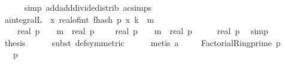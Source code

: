 \begin{isabellebody}
\ \ \ \ \isamarkupfalse%
\ {\isacharparenleft}{\kern0pt}simp\ add{\isacharcolon}{\kern0pt}add{\isacharunderscore}{\kern0pt}divide{\isacharunderscore}{\kern0pt}distrib\ ac{\isacharunderscore}{\kern0pt}simps{\isacharparenright}{\kern0pt}\isanewline
\ \ \isamarkupfalse%
\ \isamarkupfalse%
\ a{\isacharcolon}{\kern0pt}{\isachardoublequoteopen}integral\isactrlsup L\ {\isasymOmega}\ {\isacharparenleft}{\kern0pt}{\isasymlambda}x{\isachardot}{\kern0pt}\ real{\isacharunderscore}{\kern0pt}of{\isacharunderscore}{\kern0pt}int\ {\isacharparenleft}{\kern0pt}f{}{\isacharunderscore}{\kern0pt}hash\ p\ x\ k{\isacharparenright}{\kern0pt}\ {\isacharcircum}{\kern0pt}\ m{\isacharparenright}{\kern0pt}\ {\isacharequal}{\kern0pt}\ \isanewline
\ \ \ \ {\isacharparenleft}{\kern0pt}{\isacharparenleft}{\kern0pt}real\ p\ {\isacharminus}{\kern0pt}\ {}{\isacharparenright}{\kern0pt}\ {\isacharcircum}{\kern0pt}\ m\ {\isacharasterisk}{\kern0pt}\ {\isacharparenleft}{\kern0pt}real\ p\ {\isacharplus}{\kern0pt}\ {}{\isacharparenright}{\kern0pt}\ {\isacharplus}{\kern0pt}\ {\isacharparenleft}{\kern0pt}{\isacharminus}{\kern0pt}\ real\ p\ {\isacharminus}{\kern0pt}\ {}{\isacharparenright}{\kern0pt}\ {\isacharcircum}{\kern0pt}\ m\ {\isacharasterisk}{\kern0pt}\ {\isacharparenleft}{\kern0pt}real\ p\ {\isacharminus}{\kern0pt}\ {}{\isacharparenright}{\kern0pt}{\isacharparenright}{\kern0pt}\ {\isacharslash}{\kern0pt}\ {\isacharparenleft}{\kern0pt}{}\ {\isacharasterisk}{\kern0pt}\ real\ p{\isacharparenright}{\kern0pt}{\isachardoublequoteclose}\ \isamarkupfalse%
\ simp\isanewline
\isanewline
\ \ \isamarkupfalse%
\ {\isacharquery}{\kern0pt}thesis\isanewline
\ \ \ \ \isamarkupfalse%
\ {\isacharparenleft}{\kern0pt}subst\ {\isasymOmega}{\isacharunderscore}{\kern0pt}def{\isacharbrackleft}{\kern0pt}symmetric{\isacharbrackright}{\kern0pt}{\isacharparenright}{\kern0pt}\isanewline
\ \ \ \ \isamarkupfalse%
\ {\isacharparenleft}{\kern0pt}metis\ a{\isacharparenright}{\kern0pt}\isanewline
{}\isamarkupfalse%
%
\endisatagproof
{\isafoldproof}%
%
\isadelimproof
\isanewline
%
\endisadelimproof
\isanewline
{}\isamarkupfalse%
\ \isanewline
\ \ \ {\isachardoublequoteopen}Factorial{\isacharunderscore}{\kern0pt}Ring{\isachardot}{\kern0pt}prime\ p{\isachardoublequoteclose}\isanewline
\ \ \ {\isachardoublequoteopen}p\ {\isachargreater}{\kern0pt}\ {}{\isachardoublequoteclose}\isanewline

\end{isabellebody}
